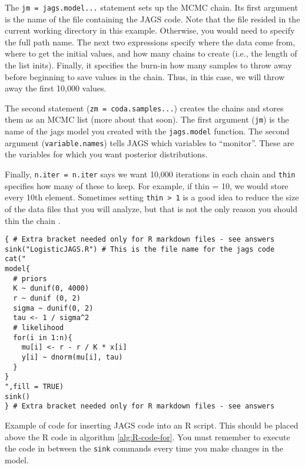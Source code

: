 \documentclass[12pt,english]{article}
\begin{document}
The \texttt{jm = jags.model...} statement sets up the MCMC chain. Its first argument is the name of the file containing the JAGS code. Note that  the file resided in the current working directory in this example. Otherwise, you would need to specify the full path name. The next two expressions specify where the data come from, where to get the initial values, and how many chains to create (i.e., the length of the list inits). Finally, it specifies the burn-in how many samples to throw away before beginning to save values in the chain. Thus, in this case, we will throw away the first 10,000 values.

The second statement (\texttt{zm = coda.samples...}) creates the chains and stores them as an MCMC list (more about that soon). The first argument (\texttt{jm}) is the name of the jags model you created with the \texttt{jags.model} function. The second argument (\texttt{variable.names}) tells JAGS which variables to \enquote{monitor}. These are the variables for which you want posterior distributions.

Finally, \texttt{n.iter = n.iter} says we want 10,000 iterations in each chain and \texttt{thin} specifies how many of these to keep. For example, if thin = 10, we would store every 10th element. Sometimes setting \texttt{thin > 1} is a good idea to reduce the size of the data files that you will analyze, but that is not the only reason you should thin the chain \citep{Link:2012ve}.

\begin{algorithm}
\begin{Verbatim}[frame=single]
{ # Extra bracket needed only for R markdown files - see answers
sink("LogisticJAGS.R") # This is the file name for the jags code
cat("
model{
  # priors
  K ~ dunif(0, 4000)
  r ~ dunif (0, 2)
  sigma ~ dunif(0, 2) 
  tau <- 1 / sigma^2
  # likelihood
  for(i in 1:n){
    mu[i] <- r - r / K * x[i]
    y[i] ~ dnorm(mu[i], tau)
  }
}  
",fill = TRUE)
sink()
} # Extra bracket needed only for R markdown files - see answers
\end{Verbatim}
\caption[Example of code for inserting JAGS code within R script]{Example of code for inserting JAGS code into an R script. This should be placed above the R code in algorithm \ref{alg:R-code-for}. You must remember to execute the code in between the \texttt{sink} commands every time you make changes in the model.}
\label{alg:Inserting JAGS code in R}
\end{algorithm}
\end{document}
